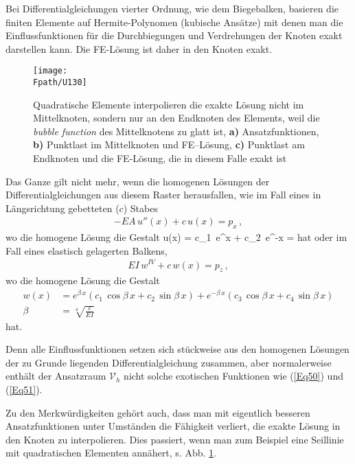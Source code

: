 {Bei Differentialgleichungen vierter Ordnung, wie dem Biegebalken, basieren die finiten Elemente auf Hermite-Polynomen (kubische Ans\"{a}tze) mit denen man die Einflussfunktionen f\"{u}r die Durchbiegungen und Verdrehungen der Knoten exakt darstellen kann. Die FE-L\"{o}sung ist daher in den Knoten  exakt.
\begin{figure}
\centering
{\texttt{[image: \\Fpath/U130]}}
  \caption{Quadratische Elemente interpolieren die exakte L\"{o}sung nicht im Mittelknoten, sondern nur an den Endknoten des Elements, weil die {\em bubble function\/} des Mittelknotens zu glatt ist, \textbf{ a)} Ansatzfunktionen, \textbf{ b)} Punktlast im Mittelknoten und FE--L\"{o}sung, \textbf{ c)} Punktlast  am Endknoten und die FE-L\"{o}sung, die in diesem Falle exakt ist}
  \label{U130}
\end{figure}%

Das Ganze gilt nicht mehr, wenn die homogenen L\"{o}sungen der Differentialgleichungen aus diesem Raster herausfallen, wie im Fall eines in L\"{a}ngsrichtung gebetteten ($c$) Stabes
\begin{align}
- EA\,u''(x) + c\,u(x) = p_x\,,
\end{align}
wo die homogene L\"{o}sung die Gestalt
\beq\label{Eq50}
u(x) = c_1 \,e^{\alpha x } + c_2\, e^{-\alpha x} \qquad \alpha = 
\eeq
hat oder im Fall eines elastisch gelagerten Balkens,
\begin{align}
 EI\,w^{IV} + c\,w(x) = p_z\,,
\end{align}
wo die homogene L\"{o}sung die Gestalt
\begin{align}\label{Eq51}
\!\!\!\!\!\!\!\!w(x) &= e^{\beta\,x}(c_1\,\cos \beta\,x + c_2\, \sin \beta\,x) +
e^{-\beta\,x}(c_3\,\cos \beta\,x + c_4\, \sin
\beta\,x)\\
\beta &= \sqrt[4]{\frac{c}{EI}}
\end{align}
hat.

Denn alle Einflussfunktionen setzen sich st\"{u}ckweise aus den homogenen L\"{o}sungen der zu Grunde liegenden Differentialgleichung zusammen, aber normalerweise enth\"{a}lt der Ansatzraum $\mathcal{V}_h$ nicht solche \glq exotischen\grq{} Funktionen wie (\ref{Eq50}) und (\ref{Eq51}).

Zu den Merkw\"{u}rdigkeiten geh\"{o}rt auch, dass man mit eigentlich besseren Ansatzfunktionen unter Umst\"{a}nden die F\"{a}higkeit verliert, die exakte L\"{o}sung in den Knoten zu interpolieren. Dies passiert, wenn man zum Beispiel eine Seillinie mit quadratischen Elementen ann\"{a}hert, s. Abb. \ref{U130}.

}
